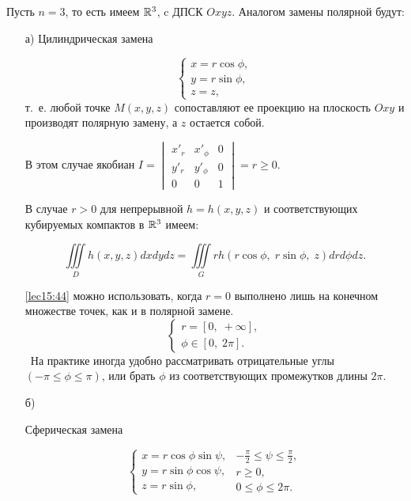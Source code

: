 \documentclass[../../main.tex]{subfiles}
\begin{document}
	\begin{iex}
		Пусть $ n = 3 $, то есть имеем $ \mathbb{R}^3 $, c ДПСК $ Oxyz $. Аналогом замены 
		полярной
		будут:
		\begin{itemize}
			\item[а)]
			Цилиндрическая замена
			
			\[\begin{cases}
				x = r \cos{\phi},\\
				y = r \sin{\phi},\\
				z = z,
			\end{cases}\]
			т.~е. любой точке $M(x,y,z)$ сопоставляют ее проекцию на плоскость $Oxy$ и 
			производят полярную замену, а $z$ остается собой.
			
			В этом случае якобиан $I = \begin{vmatrix}
			x'_r & x'_\phi & 0 \\
			y'_r & y'_\phi & 0 \\
			0 & 0 & 1
			\end{vmatrix}=r\geq 0$.
			
			В случае $r > 0$ для непрерывной $h=h(x, y, z)$ и соответствующих
			кубируемых компактов в $\mathbb{R}^3$ имеем:
			
			\begin{equation}
			\label{lec15:44}
			\iiint\limits_{D} h(x, y, z) dx dy dz=
			\iiint\limits_{G} rh(r\cos{\phi},\; r\sin{\phi},\; z) dr d\phi dz.
			\end{equation}
			
			\eqref{lec15:44} можно использовать, когда $r=0$ выполнено лишь на конечном 
			множестве  точек, как и в полярной замене.
			\[
			\begin{cases}
			r = [0,\;+\infty], \\ \phi \in [0,\; 2\pi].
			\end{cases}\]\
			На практике иногда удобно рассматривать
			отрицательные углы $(-\pi \leq \phi \leq \pi)$, или брать $\phi$ из
			соответствующих промежутков длины $2\pi$.
			
			\item[б)]
			
			Сферическая замена 
			
			\[\begin{cases}
			x = r \cos{\phi} \sin{\psi},\\
			y = r \sin{\phi} \cos{\psi},\\
			z = r \sin{\phi},
			\end{cases}
			\begin{array}{l}
			 -\frac{\pi}{2}\leq \psi \leq \frac{\pi}{2},\\
			 r \geq 0,\\
			 0 \leq \phi \leq 2\pi.
			\end{array}\]
			

\end{itemize}
\end{iex}
\end{document}
